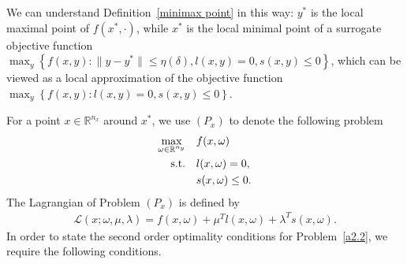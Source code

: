 \documentclass{article}
\begin{document}
	We can understand Definition~\ref{minimax point} in this way: $y^{\ast}$ is the local maximal point of $f(x^{\ast}, \cdot)$, while $x^{\ast}$ is the local minimal point of a surrogate objective function $\max_{y}\left\lbrace f(x, y): \|y - y^{\ast}\|\leq \eta(\delta), l(x, y) = 0, s(x, y) \leq 0\right\rbrace$, which can be viewed as a local approximation of the objective function $\max_{y}\left\lbrace f(x, y) : l(x, y) = 0, s(x, y) \leq 0\right\rbrace$.
	
	For a point $x \in \mathbb{R}^{n_{x}}$ around $x^{\ast}$, we use $(P_{x})$ to denote the following problem 
	\begin{align*}
		\begin{aligned}
			\max_{\omega \in \mathbb{R}^{n_{y}}}\quad & f(x, \omega)\\
			{\rm s.t.}\quad & l(x, \omega) = 0,\\
			& s(x, \omega) \leq 0.
		\end{aligned}
	\end{align*}
	The Lagrangian of Problem $(P_{x})$ is defined by
	\begin{align*}
		\mathcal{L}(x; \omega, \mu, \lambda) = f(x, \omega) + \mu^{T}l(x, \omega) + \lambda^{T}s(x, \omega).
	\end{align*}
	In order to state the second order optimality conditions for Problem~\eqref{a2.2}, we require the following conditions.
\end{document}
